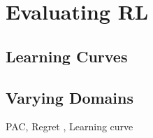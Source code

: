 \section{Evaluating RL}
\subsection{Learning Curves}
\subsection{Varying Domains}
PAC, Regret \cite{lattimore}, Learning curve